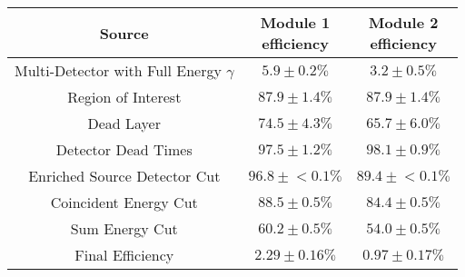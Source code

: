 \begin{tabular}{|c|c|c|}
\hline
  Source & \makecell{Module 1\\efficiency} & \makecell{Module 2\\efficiency} \\
\hline
  \makecell{Multi-Detector with\\Full Energy $\gamma$} & $5.9 \pm 0.2\%$ & $3.2 \pm 0.5\%$ \\
  Region of Interest & $87.9 \pm 1.4\%$ & $87.9 \pm 1.4\%$ \\
  Dead Layer & $74.5 \pm 4.3\%$ & $65.7 \pm 6.0\%$ \\
  Detector Dead Times & $97.5 \pm 1.2\%$ & $98.1 \pm 0.9\%$ \\
  Enriched Source Detector Cut & $96.8 \pm{}<\!0.1\%$ & $89.4 \pm{}<\!0.1\%$ \\
  Coincident Energy Cut & $88.5 \pm 0.5\%$ & $84.4 \pm 0.5\%$ \\
  Sum Energy Cut & $60.2 \pm 0.5\%$ & $54.0 \pm 0.5\%$ \\
  \hline Final Efficiency & $2.29 \pm 0.16\%$ & $0.97 \pm 0.17\%$ \\
\hline
\end{tabular}
